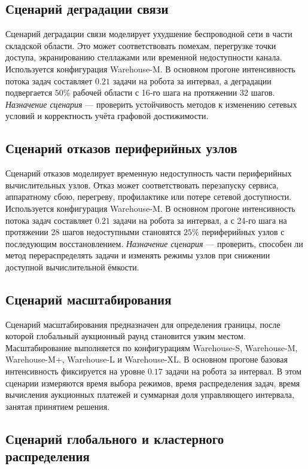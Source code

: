 \subsection{Сценарий деградации связи}

Сценарий деградации связи моделирует ухудшение беспроводной сети в части складской области. Это может соответствовать помехам, перегрузке точки доступа, экранированию стеллажами или временной недоступности канала. Используется конфигурация Warehouse-M. В основном прогоне интенсивность потока задач составляет $0.21$ задачи на робота за интервал, а деградации подвергается $50\%$ рабочей области с 16-го шага на протяжении 32 шагов. \textit{Назначение сценария} --- проверить устойчивость методов к изменению сетевых условий и корректность учёта графовой достижимости.

\subsection{Сценарий отказов периферийных узлов}

Сценарий отказов моделирует временную недоступность части периферийных вычислительных узлов. Отказ может соответствовать перезапуску сервиса, аппаратному сбою, перегреву, профилактике или потере сетевой доступности. Используется конфигурация Warehouse-M. В основном прогоне интенсивность потока задач составляет $0.21$ задачи на робота за интервал, а с 24-го шага на протяжении 28 шагов недоступными становятся $25\%$ периферийных узлов с последующим восстановлением. \textit{Назначение сценария} --- проверить, способен ли метод перераспределять задачи и изменять режимы узлов при снижении доступной вычислительной ёмкости.

\subsection{Сценарий масштабирования}

Сценарий масштабирования предназначен для определения границы, после которой глобальный аукционный раунд становится узким местом. Масштабирование выполняется по конфигурациям Warehouse-S, Warehouse-M, Warehouse-M+, Warehouse-L и Warehouse-XL. В основном прогоне базовая интенсивность фиксируется на уровне $0.17$ задачи на робота за интервал. В этом сценарии измеряются время выбора режимов, время распределения задач, время вычисления аукционных платежей и суммарная доля управляющего интервала, занятая принятием решения.

\subsection{Сценарий глобального и кластерного распределения}

